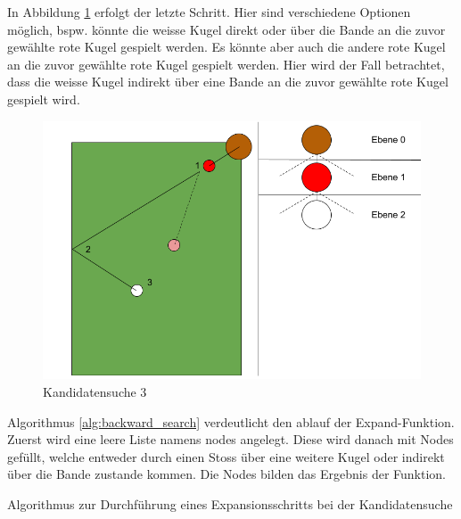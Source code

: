 In Abbildung \ref{fig:backwardsearch_3} erfolgt der letzte Schritt. Hier sind verschiedene Optionen möglich, bspw.
könnte die weisse Kugel direkt oder über die Bande an die zuvor gewählte rote Kugel gespielt werden. Es könnte aber auch
die andere rote Kugel an die zuvor gewählte rote Kugel gespielt werden. Hier wird der Fall betrachtet, dass die weisse Kugel
indirekt über eine Bande an die zuvor gewählte rote Kugel gespielt wird.
\begin{figure}[h!]
    \begin{center}
        \includegraphics[width=0.5\linewidth]{../common/03_billiard_ai/resources/13_backwardsearch_3.png}
    \end{center}
    \caption{Kandidatensuche 3}
    \label{fig:backwardsearch_3}
\end{figure}

Algorithmus \ref{alg:backward_search} verdeutlicht den ablauf der \glqq Expand-Funktion\grqq. Zuerst wird eine
leere Liste namens \glqq nodes\grqq{} angelegt. Diese wird danach mit Nodes gefüllt, welche entweder durch einen Stoss
über eine weitere Kugel oder indirekt über die Bande zustande kommen. Die Nodes bilden das Ergebnis der Funktion.

\begin{algorithm}[H]
    \DontPrintSemicolon
    \caption{Algorithmus zur Durchführung eines Expansionsschritts bei der Kandidatensuche}
    \label{alg:backward_search}
\end{algorithm}


